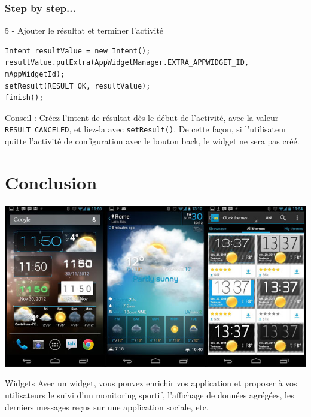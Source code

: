 \documentclass{beamer}
\begin{document}
\begin{frame}[fragile]
\frametitle{Step by step...}

\begin{block}{5 - Ajouter le résultat et terminer l'activité}
\begin{lstlisting}
Intent resultValue = new Intent();
resultValue.putExtra(AppWidgetManager.EXTRA_APPWIDGET_ID, mAppWidgetId);
setResult(RESULT_OK, resultValue);
finish();
\end{lstlisting}
\end{block}

\begin{block}{Conseil :}
Créez l'intent de résultat dès le début de l'activité, avec la valeur \verb!RESULT_CANCELED!, et liez-la avec \verb!setResult()!. De cette façon, si l'utilisateur quitte l'activité de configuration avec le bouton back, le widget ne sera pas créé.
\end{block}

\end{frame}


\section{Conclusion}

\begin{frame}
\begin{center}
\includegraphics[scale=0.3]{widgets.jpg}
\end{center}
\begin{block}{Widgets}
Avec un widget, vous pouvez enrichir vos application et proposer à vos utilisateurs le suivi d'un monitoring sportif, l'affichage de données agrégées, les derniers messages reçus sur une application sociale, etc.
\end{block}

\end{frame}
\end{document}
